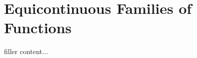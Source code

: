 \section{Equicontinuous Families of Functions}\label{sec:equicontinuous-families-of-functions}

filler content...

